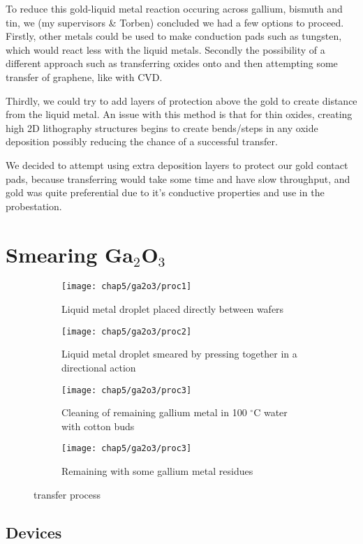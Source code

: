 \documentclass[../Matt_Gebert_Honours_Thesis.tex]{subfiles}
\begin{document}
	To reduce this gold-liquid metal reaction occuring across gallium, bismuth and tin, we (my supervisors \& Torben) concluded we had a few options to proceed. Firstly, other metals could be used to make conduction pads such as tungsten, which would react less with the liquid metals. Secondly the possibility of a different approach such as transferring oxides onto \silicondioxide{} and then attempting some transfer of graphene, like with CVD. 
	
	Thirdly, we could try to add layers of protection above the gold to create distance from the liquid metal. An issue with this method is that for thin oxides, creating high 2D lithography structures begins to create bends/steps in any oxide deposition possibly reducing the chance of a successful transfer.
	
	We decided to attempt using extra deposition layers to protect our gold contact pads, because transferring would take some time and have slow throughput, and gold was quite preferential due to it's conductive properties and use in the probestation.
	
	\section{Smearing Ga$_2$O$_3$}\label{sec:smearing}
	
	\begin{figure}
		\begin{subfigure}{0.24\textwidth}
			\texttt{[image: chap5/ga2o3/proc1]}
			\caption{Liquid metal droplet placed directly between \silicondioxide{} wafers}
		\end{subfigure}
		\begin{subfigure}{0.24\textwidth}
			\texttt{[image: chap5/ga2o3/proc2]}
			\caption{Liquid metal droplet smeared by pressing \silicondioxide{} together in a directional action}
		\end{subfigure}
		\begin{subfigure}{0.24\textwidth}
			\texttt{[image: chap5/ga2o3/proc3]}
			\caption{Cleaning of remaining gallium metal in 100 $^\circ$C water with cotton buds}
		\end{subfigure}
		\begin{subfigure}{0.24\textwidth}
			\texttt{[image: chap5/ga2o3/proc3]}
			\caption{Remaining \galliumoxide{} with some gallium metal residues}
		\end{subfigure}
		\caption[\galliumoxide{} transfer process]{\galliumoxide{} transfer process}
	\end{figure}
	
	\subsection{Devices}
	
	
	
\end{document}
